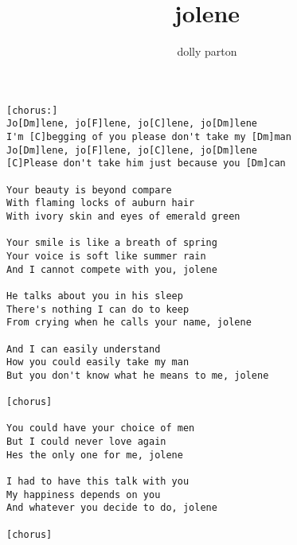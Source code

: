 \author{dolly parton}
\title{jolene}
\maketitle
\begin{verbatim}
[chorus:]
Jo[Dm]lene, jo[F]lene, jo[C]lene, jo[Dm]lene
I'm [C]begging of you please don't take my [Dm]man
Jo[Dm]lene, jo[F]lene, jo[C]lene, jo[Dm]lene
[C]Please don't take him just because you [Dm]can

Your beauty is beyond compare
With flaming locks of auburn hair
With ivory skin and eyes of emerald green

Your smile is like a breath of spring
Your voice is soft like summer rain
And I cannot compete with you, jolene

He talks about you in his sleep
There's nothing I can do to keep
From crying when he calls your name, jolene

And I can easily understand
How you could easily take my man
But you don't know what he means to me, jolene

[chorus]

You could have your choice of men
But I could never love again
Hes the only one for me, jolene

I had to have this talk with you
My happiness depends on you
And whatever you decide to do, jolene

[chorus]
\end{verbatim}